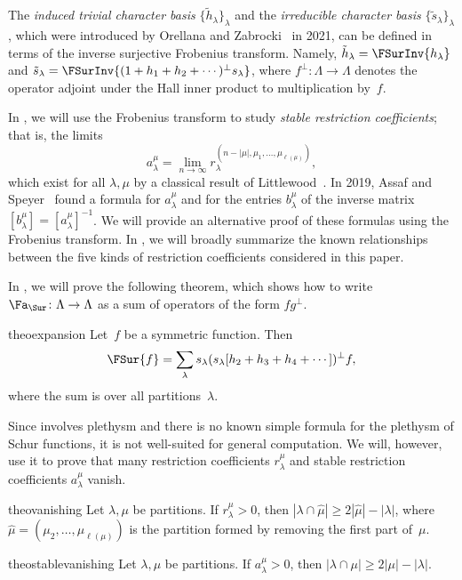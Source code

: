 The \emph{induced trivial character basis} $\{\tilde{h}_\lambda\}_\lambda$ and the \emph{irreducible character basis} $\{\tilde{s}_\lambda\}_\lambda$, which were introduced by Orellana and Zabrocki~\cite{MR4295089} in 2021, can be defined in terms of the inverse surjective Frobenius transform. Namely, $\tilde{h}_\lambda = \FSurInv{h_\lambda}$ and $\tilde{s}_\lambda = \FSurInv{(1 + h_1 + h_2 + \cdots)^{\perp} s_\lambda}$, where $f^\perp\colon \Lambda \to \Lambda$ denotes the operator adjoint under the Hall inner product to multiplication by~$f$.

In , we will use the Frobenius transform to study \emph{stable restriction coefficients}; that is, the limits \[a_\lambda^\mu = \lim_{n \to \infty} r_{\lambda}^{(n - |\mu|, \mu_1, \ldots, \mu_{\ell(\mu)})},\] which exist for all $\lambda, \mu$ by a classical result of Littlewood~\cite{MR1576896}. In 2019, Assaf and Speyer~\cite{MR4055931} found a formula for $a_\lambda^\mu$ and for the entries $b_\lambda^\mu$ of the inverse matrix $[b_\lambda^\mu] = [a_\lambda^\mu]^{-1}$. We will provide an alternative proof of these formulas using the Frobenius transform. In , we will broadly summarize the known relationships between the five kinds of restriction coefficients considered in this paper.

In , we will prove the following theorem, which shows how to write $\Fa_{\Sur} \colon \Lambda \to \Lambda$ as a sum of operators of the form $fg^\perp$.
\begin{restatable}{theo}{expansion}\label{theorem:expansion}
    Let~$f$ be a symmetric function. Then
    \[
        \FSur{f} = \sum_{\lambda} s_\lambda (s_\lambda[h_2 + h_3 + h_4 + \cdots])^\perp f,
    \]
    where the sum is over all partitions~$\lambda$.
\end{restatable}
Since  involves plethysm and there is no known simple formula for the plethysm of Schur functions, it is not well-suited for general computation. We will, however, use it to prove that many restriction coefficients $r_\lambda^\mu$ and stable restriction coefficients $a_\lambda^\mu$ vanish.
\begin{restatable}{theo}{vanishing}\label{theorem:vanishing}
    Let $\lambda, \mu$ be partitions. If $r_\lambda^\mu > 0$, then $|\lambda \cap \hat \mu| \geq 2|\hat \mu| - |\lambda|$, where $\hat \mu = (\mu_2, \ldots, \mu_{\ell(\mu)})$ is the partition formed by removing the first part of~$\mu$.
\end{restatable}
\begin{restatable}{theo}{stablevanishing}\label{theorem:stablevanishing}
    Let $\lambda, \mu$ be partitions. If $a_\lambda^\mu > 0$, then $|\lambda \cap \mu| \geq 2|\mu| - |\lambda|$.
\end{restatable}

